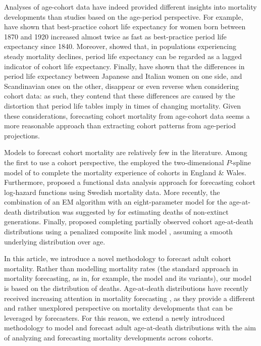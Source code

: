 \documentclass[11pt, a4paper]{article}
\begin{document}

Analyses of age-cohort data have indeed provided different insights into mortality developments than studies based on the age-period perspective. For example, \cite{shkolnikov2011steep} have shown that best-practice cohort life expectancy for women born between 1870 and 1920 increased almost twice as fast as best-practice period life expectancy since 1840. Moreover, \cite{goldstein2006relationships} showed that, in populations experiencing steady mortality declines, period life expectancy can be regarded as a lagged indicator of cohort life expectancy. Finally, \cite{borgan2019cohort} have shown that the differences in period life expectancy between Japanese and Italian women on one side, and Scandinavian ones on the other, disappear or even reverse when considering cohort data: as such, they contend that these differences are caused by the distortion that period life tables imply in times of changing mortality. Given these considerations, forecasting cohort mortality from age-cohort data seems a more reasonable approach than extracting cohort patterns from age-period projections.

Models to forecast cohort mortality are relatively few in the literature. Among the first to use a cohort perspective, the \cite{cmi2007stochastic} employed the two-dimensional $P$-spline model of \cite{currie2004smoothing} to complete the mortality experience of cohorts in England \& Wales. Furthermore, \cite{chiou2009modeling} proposed a functional data analysis approach for forecasting cohort log-hazard functions using Swedish mortality data. More recently, the combination of an EM algorithm with an eight-parameter model for the age-at-death distribution was suggested by \cite{zanotto2017reconstruction} for estimating deaths of non-extinct generations. Finally, \cite{rizzi2019forecasting} proposed completing partially observed cohort age-at-death distributions using a penalized composite link model \citep{eilers2007ill}, assuming a smooth underlying distribution over age. 

In this article, we introduce a novel methodology to forecast adult cohort mortality. Rather than modelling mortality rates (the standard approach in mortality forecasting, as in, for example, the \citeauthor{lee1992modeling} model and its variants), our model is based on the distribution of deaths. Age-at-death distributions have recently received increasing attention in mortality forecasting \citep{oeppen2008coherent,bergeron2017coherent,basellini2019three,basellini2019modelling,pascariu2019maximum}, as they provide a different and rather unexplored perspective on mortality developments that can be leveraged by forecasters. For this reason, we extend a newly introduced methodology to model and forecast adult age-at-death distributions \citep{basellini2019modelling} with the aim of analyzing and forecasting mortality developments across cohorts. 
 
\end{document}
